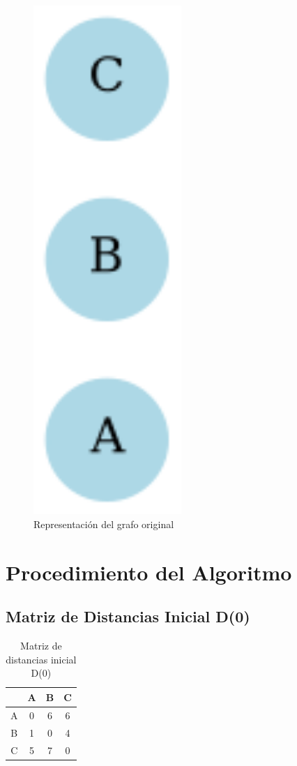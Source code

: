 \documentclass[12pt]{article}
\begin{document}
\begin{figure}[h!]
\centering
\includegraphics[width=0.5\textwidth,keepaspectratio]{grafo.png}
\caption{Representación del grafo original}
\end{figure}

\clearpage
\section{Procedimiento del Algoritmo}
\subsection{Matriz de Distancias Inicial D(0)}
\begin{table}[h!]
\centering
\begin{tabular}{|c|c|c|c|}
\hline
 & A & B & C \\\hline
A & 0 & 6 & 6 \\\hline
B & 1 & 0 & 4 \\\hline
C & 5 & 7 & 0 \\\hline
\end{tabular}
\caption{Matriz de distancias inicial D(0)}
\end{table}
\end{document}
